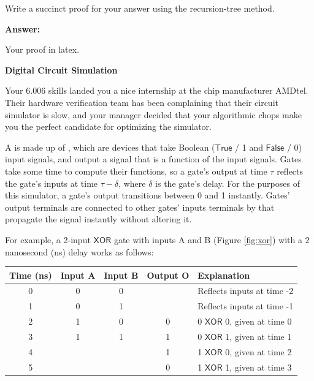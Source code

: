 \documentclass[12pt,twoside]{article}
\newcommand{\answer}{
	\par\medskip
	\textbf{Answer:}
}
\newcommand{\answerIu}{ \answer
	Your proof in latex.
}
\begin{document}
\begin{problems}
\begin{problemparts}
		\problempart {} Write a succinct proof for your answer using the
		recursion-tree method.
		\answerIu
	\end{problemparts}



	\problem {} \textbf{Digital Circuit Simulation}

	Your 6.006 skills landed you a nice internship at the chip manufacturer AMDtel.
	Their hardware verification team has been complaining that their circuit
	simulator is slow, and your manager decided that your algorithmic chops make
	you the perfect candidate for optimizing the simulator.

	A  is made up of , which are devices that take Boolean
	($\mathsf{True}$ / 1 and $\mathsf{False}$ / 0) input signals, and output a
	signal that is a function of the input signals. Gates take some time to compute
	their functions, so a gate's output at time $\tau$ reflects the gate's inputs at
	time $\tau - \delta$, where $\delta$ is the gate's delay. For the purposes of
	this simulator, a gate's output transitions between 0 and 1 instantly. Gates'
	output terminals are connected to other gates' inputs terminals by 
	that propagate the signal instantly without altering it.

	For example, a 2-input $\mathsf{XOR}$ gate with inputs A and B (Figure
	\ref{fig:xor}) with a 2 nanosecond (ns) delay works as follows:

	\begin{center}
		\begin{tabular}{|c|c|c|c|l|}
			\hline
			Time (ns) & Input A & Input B & Output O & Explanation                         \\
			\hline
			0         & 0       & 0       &          & Reflects inputs at time -2          \\
			1         & 0       & 1       &          & Reflects inputs at time -1          \\
			2         & 1       & 0       & 0        & 0 $\mathsf{XOR}$ 0, given at time 0 \\
			3         & 1       & 1       & 1        & 0 $\mathsf{XOR}$ 1, given at time 1 \\
			4         &         &         & 1        & 1 $\mathsf{XOR}$ 0, given at time 2 \\
			5         &         &         & 0        & 1 $\mathsf{XOR}$ 1, given at time 3 \\
			\hline
		\end{tabular}
	\end{center}


\end{problems}
\end{document}
